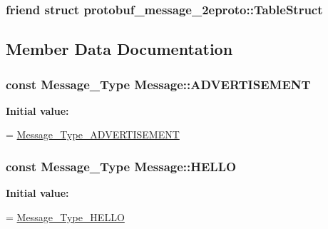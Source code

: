 \subsubsection[{\texorpdfstring{protobuf\+\_\+message\+\_\+2eproto\+::\+Table\+Struct}{protobuf_message_2eproto::TableStruct}}]{\setlength{\rightskip}{0pt plus 5cm}friend struct {\bf protobuf\+\_\+message\+\_\+2eproto\+::\+Table\+Struct}\hspace{0.3cm}{\ttfamily [friend]}}\hypertarget{class_message_a2a479fe4885e147bf2a7ae83f2bf282e}{}\label{class_message_a2a479fe4885e147bf2a7ae83f2bf282e}


\subsection{Member Data Documentation}
\subsubsection[{\texorpdfstring{A\+D\+V\+E\+R\+T\+I\+S\+E\+M\+E\+NT}{ADVERTISEMENT}}]{\setlength{\rightskip}{0pt plus 5cm}const {\bf Message\+\_\+\+Type} Message\+::\+A\+D\+V\+E\+R\+T\+I\+S\+E\+M\+E\+NT\hspace{0.3cm}{\ttfamily [static]}}\hypertarget{class_message_a9079ebddf775dd11d7bae2ec733e961d}{}\label{class_message_a9079ebddf775dd11d7bae2ec733e961d}
{\bfseries Initial value\+:}
\begin{DoxyCode}
=
    \hyperlink{message_8pb_8h_a1b620cd54f3d6b48f3c5f7979545b160aaf909cb57ee266259b2a3557e5baf098}{Message\_Type\_ADVERTISEMENT}
\end{DoxyCode}
\subsubsection[{\texorpdfstring{H\+E\+L\+LO}{HELLO}}]{\setlength{\rightskip}{0pt plus 5cm}const {\bf Message\+\_\+\+Type} Message\+::\+H\+E\+L\+LO\hspace{0.3cm}{\ttfamily [static]}}\hypertarget{class_message_a6bda6b58f826adddb08642316e32ed1f}{}\label{class_message_a6bda6b58f826adddb08642316e32ed1f}
{\bfseries Initial value\+:}
\begin{DoxyCode}
=
    \hyperlink{message_8pb_8h_a1b620cd54f3d6b48f3c5f7979545b160ab791bcd660645a863b5ea1a1f1a8291d}{Message\_Type\_HELLO}
\end{DoxyCode}
